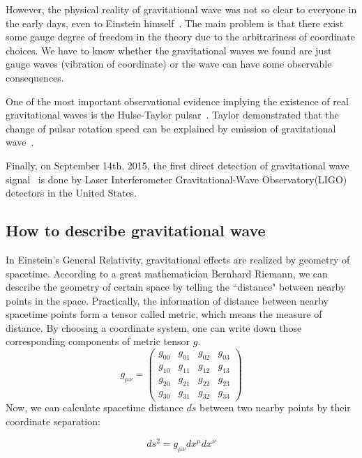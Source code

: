 However, the physical reality of gravitational wave was not so clear to everyone in the early days, even to Einstein himself~\cite{Einstein:prl, Einstein:ongw}. The main problem is that there exist some gauge degree of freedom in the theory due to the arbitrariness of coordinate choices. We have to know whether the gravitational waves we found are just gauge waves (vibration of coordinate) or the wave can have some observable consequences. 

One of the most important observational evidence implying the existence of real gravitational waves is the Hulse-Taylor pulsar~\cite{HulseTaylor:discovery}. Taylor demonstrated that the change of pulsar rotation speed can be explained by emission of gravitational wave~\cite{HulseTaylor:gr, HulseTaylor:gr2}.  

Finally, on September 14th, 2015, the first direct detection of gravitational wave signal~\cite{gw:150914_det} is done by Laser Interferometer Gravitational-Wave Observatory(LIGO) detectors in the United States.

\subsection{How to describe gravitational wave}

In Einstein's General Relativity, gravitational effects are realized by geometry of spacetime. According to a great mathematician Bernhard Riemann, we can describe the geometry of certain space by telling the ``distance" between nearby points in the space. Practically, the information of distance between nearby spacetime points form a tensor called metric, which means the measure of distance. By choosing a coordinate system, one can write down those corresponding components of metric tensor $g$.
\begin{equation}
    g_{\mu\nu}=
\left(
\begin{array}{cccc}
  g_{00} & g_{01} & g_{02} & g_{03} \\
  g_{10} & g_{11} & g_{12} & g_{13} \\
  g_{20} & g_{21} & g_{22} & g_{23} \\
  g_{30} & g_{31} & g_{32} & g_{33}
\end{array}
\right)  
\end{equation}
 Now, we can calculate spacetime distance $ds$ between two nearby points by their coordinate separation:

\begin{equation}
    ds^2 = g_{\mu\nu} dx^{\mu} dx^{\nu}
\end{equation}




